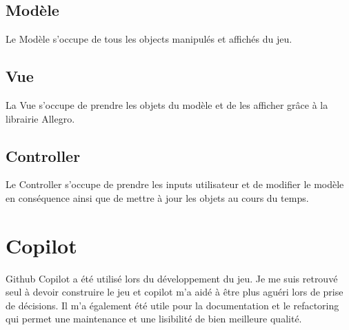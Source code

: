 \documentclass{article}
\begin{document}
\subsection{Modèle}

Le Modèle s'occupe de tous les objects manipulés et affichés du jeu.

\subsection{Vue}

La Vue s'occupe de prendre les objets du modèle et de les afficher grâce à la librairie Allegro.

\subsection{Controller}

Le Controller s'occupe de prendre les inputs utilisateur et de modifier le modèle en conséquence ainsi que de mettre à jour les objets au cours du temps.

\section{Copilot}

Github Copilot a été utilisé lors du développement du jeu. Je me suis retrouvé seul à devoir construire le jeu et copilot m'a aidé à être plus aguéri lors de prise de décisions. 
Il m'a également été utile pour la documentation et le refactoring qui permet une maintenance et une lisibilité de bien meilleure qualité.

\end{document}
